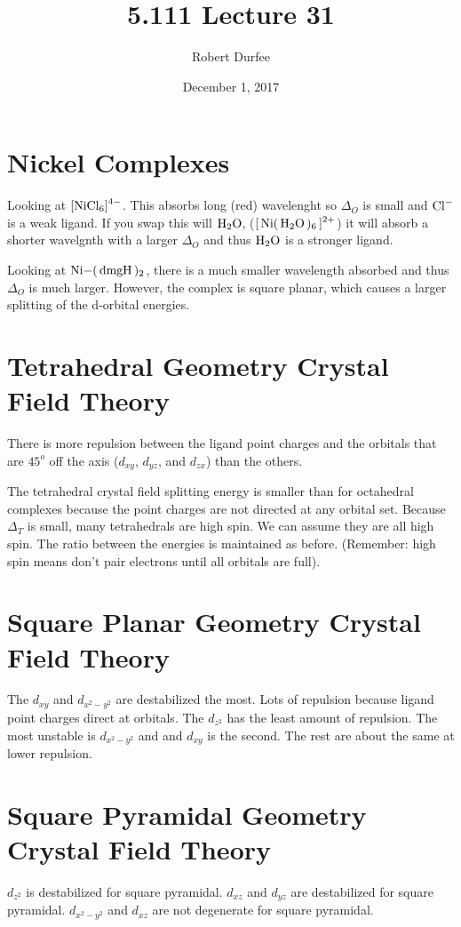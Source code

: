 \documentclass{article}
\title{ 5.111 Lecture 31 }
\author{ Robert Durfee }
\date{ December 1, 2017 }
\begin{document}
\maketitle

\section{ Nickel Complexes }

Looking at $\ce{ [NiCl_{6}]^{4-} }$. This absorbs long (red) wavelenght so
$\Delta_{O}$ is small and $\ce{ Cl- }$ is a weak ligand. If you swap this will
$\ce{ H_{2}O }$, ($\ce{ [ Ni( H_{2}O )_{6} ]^{2+} }$) it will absorb a shorter
wavelgnth with a larger $\Delta_{O}$ and thus $\ce{ H_{2}O }$ is a stronger
ligand.

Looking at $\ce{ Ni-( dmgH )_{2} }$, there is a much smaller wavelength absorbed
and thus $\Delta_{O}$ is much larger. However, the complex is square planar,
which causes a larger splitting of the d-orbital energies.

\section{ Tetrahedral Geometry Crystal Field Theory }

There is more repulsion between the ligand point charges and the orbitals that
are $45^{o}$ off the axis ($d_{xy}$, $d_{yz}$, and $d_{zx}$) than the others.

The tetrahedral crystal field splitting energy is smaller than for octahedral
complexes because the point charges are not directed at any orbital set. Because
$\Delta_{T}$ is small, many tetrahedrals are high spin. We can assume they are
all high spin. The ratio between the energies is maintained as before.
(Remember: high spin means don't pair electrons until all orbitals are full).

\section{ Square Planar Geometry Crystal Field Theory }

The $d_{xy}$ and $d_{x^{2}-y^{2}}$ are destabilized the most. Lots of repulsion
because ligand point charges direct at orbitals. The $d_{z^{2}}$ has the least
amount of repulsion. The most unstable is $d_{x^{2}-y^{2}}$ and and $d_{xy}$ is
the second. The rest are about the same at lower repulsion.

\section{ Square Pyramidal Geometry Crystal Field Theory }

$d_{z^{2}}$ is destabilized for square pyramidal. $d_{xz}$ and $d_{yz}$ are
destabilized for square pyramidal. $d_{x^{2}-y^{2}}$ and $d_{xz}$ are not
degenerate for square pyramidal. 
\end{document}
